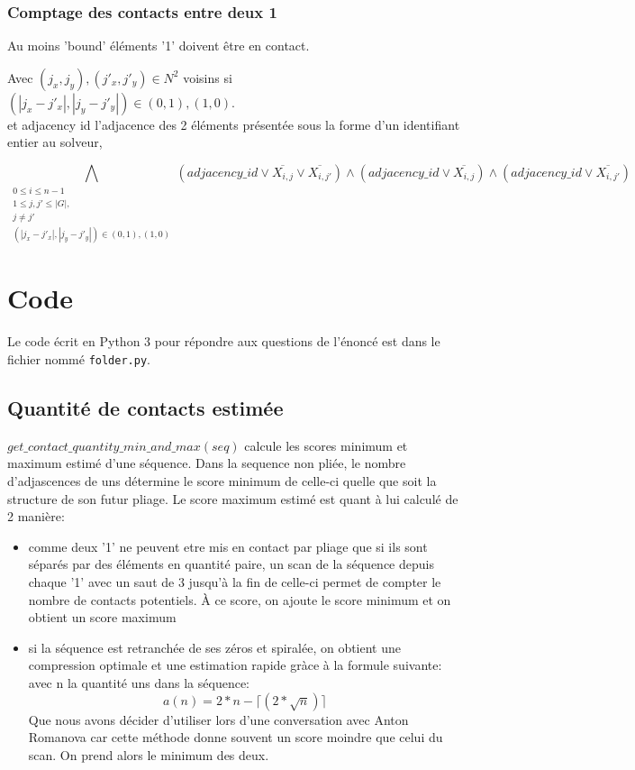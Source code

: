 \documentclass[utf8]{article}
\begin{document}
\subsubsection{Comptage des contacts entre deux 1}
Au moins 'bound' éléments '1' doivent être en contact.

Avec  $(j_x, j_y), (j'_x, j'_y) \in N^2$
 voisins si $(|j_x - j'_x|, |j_y - j'_y|) \in {(0, 1), (1, 0)}.$
\\et adjacency id l'adjacence des 2 éléments présentée sous la forme d'un identifiant entier au solveur,

\begin{center}
    \[ \bigwedge_{\substack{0\leq i\leq n-1
    \\1\leq j , j'\leq |G|,\>
    \\ j\neq j'
    \\(|j_x - j'_x|, |j_y - j'_y|) \in {(0, 1), (1, 0)}}} (adjacency\_id \vee \overline{X_{i,j}} \vee \overline{X_{i,j'}}) \wedge (adjacency\_id \vee \overline{X_{i,j}}) \wedge (adjacency\_id \vee \overline{X_{i,j'}}) \]
\end{center}

\section{Code}
Le code écrit en Python 3 pour répondre aux questions de l'énoncé est dans le fichier nommé \verb|folder.py|.

\subsection{Quantité de contacts estimée}
$ get\_contact\_quantity\_min\_and\_max(seq)$ calcule les scores minimum et maximum estimé d'une séquence.
Dans la sequence non pliée, le nombre d'adjascences de uns détermine le score minimum de celle-ci quelle que soit la structure de son futur pliage.
Le score maximum estimé est quant à lui calculé de 2 manière:
\begin{itemize}

    \item comme deux '1' ne peuvent etre mis en contact par pliage que si ils sont séparés par des éléments en quantité paire, un scan de la séquence depuis chaque '1' avec un saut de 3 jusqu'à la fin de celle-ci permet de compter le nombre de contacts potentiels. À ce score, on ajoute le score minimum et on obtient un score maximum
    \item si la séquence est retranchée de ses zéros et spiralée, on obtient une compression optimale et une estimation rapide gràce à la formule suivante:
    avec n la quantité uns dans la séquence:
    \begin{equation}
        a(n) = 2*n - \lceil(2*\sqrt{n})\rceil
    \end{equation}
    Que nous avons décider d'utiliser lors d'une conversation avec Anton Romanova car cette méthode donne souvent un score moindre que celui du scan.
    On prend alors le minimum des deux.
\end{itemize}
\end{document}
